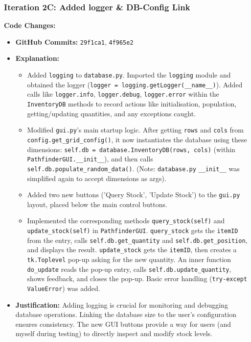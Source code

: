 \newpage

\subsubsection{Iteration 2C: Added logger \& DB-Config Link}

\textbf{Code Changes:}
\begin{itemize}
	\item \textbf{GitHub Commits:} \verb|29f1ca1|, \verb|4f965e2|
	\item \textbf{Explanation:}
	\begin{itemize}
		\item Added \verb|logging| to \verb|database.py|. Imported the \verb|logging| module and obtained the logger (\verb|logger = logging.getLogger(__name__)|). Added calls like \verb|logger.info|, \verb|logger.debug|, \verb|logger.error| within the \verb|InventoryDB| methods to record actions like initialisation, population, getting/updating quantities, and any exceptions caught.
		\item Modified \verb|gui.py|'s main startup logic. After getting \verb|rows| and \verb|cols| from \verb|config.get_grid_config()|, it now instantiates the database using these dimensions: \verb|self.db = database.InventoryDB(rows, cols)| (within \verb|PathfinderGUI.__init__|), and then calls \verb|self.db.populate_random_data()|. (Note: \verb|database.py| \verb|__init__| was simplified again to accept dimensions as args).
		\item Added two new buttons ('Query Stock', 'Update Stock') to the \verb|gui.py| layout, placed below the main control buttons.
		\item Implemented the corresponding methods \verb|query_stock(self)| and \verb|update_stock(self)| in \verb|PathfinderGUI|. \verb|query_stock| gets the \verb|itemID| from the entry, calls \verb|self.db.get_quantity| and \verb|self.db.get_position|, and displays the result. \verb|update_stock| gets the \verb|itemID|, then creates a \verb|tk.Toplevel| pop-up asking for the new quantity. An inner function \verb|do_update| reads the pop-up entry, calls \verb|self.db.update_quantity|, shows feedback, and closes the pop-up. Basic error handling (\verb|try-except ValueError|) was added.
	\end{itemize}
	\item \textbf{Justification:} Adding logging is crucial for monitoring and debugging database operations. Linking the database size to the user's configuration ensures consistency. The new GUI buttons provide a way for users (and myself during testing) to directly inspect and modify stock levels.
\end{itemize}

